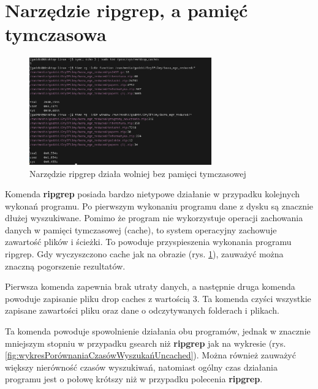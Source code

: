 \section{Narzędzie ripgrep, a pamięć tymczasowa}


\begin{figure}[htbp]
    \centering
    \includegraphics[width=0.7\textwidth]{./images/ripgrep-clear-cache-slow.png}
    \caption{Narzędzie ripgrep działa wolniej bez pamięci tymczasowej}
    \label{fig:ClearCacheRipgrep}
\end{figure}

Komenda \textbf{ripgrep} posiada bardzo nietypowe działanie w przypadku kolejnych wykonań 
programu. Po pierwszym wykonaniu programu dane z dysku są znacznie dłużej
wyszukiwane. Pomimo że program nie wykorzystuje operacji zachowania danych
w pamięci tymczasowej (cache), to system operacyjny zachowuje zawartość plików 
i ścieżki. To powoduje przyspieszenia wykonania programu ripgrep. Gdy 
wyczyszczono cache jak na obrazie (rys. \ref{fig:ClearCacheRipgrep}),
zauważyć można znaczną pogorszenie rezultatów.

Pierwsza komenda zapewnia brak utraty
danych, a następnie druga komenda powoduje zapisanie pliku drop caches z wartością 3.
Ta komenda czyści wszystkie zapisane zawartości pliku oraz dane o odczytywanych
folderach i plikach.

Ta komenda powoduje spowolnienie działania obu programów, jednak w znacznie
mniejszym stopniu w przypadku gsearch niż \textbf{ripgrep} jak na wykresie (rys. \ref{fig:wykresPorównaniaCzasówWyszukańUncached}).
Można również zauważyć większy nierówność czasów wyszukiwań, natomiast
ogólny czas działania programu jest o połowę krótszy niż w przypadku polecenia \textbf{ripgrep}.

